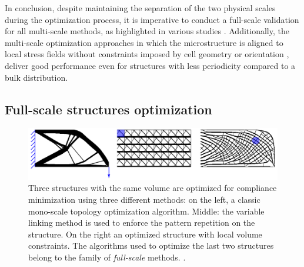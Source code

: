 In conclusion, despite maintaining the separation of the two physical scales during the optimization process, it is imperative to conduct a full-scale validation for all multi-scale methods, as highlighted in various studies . Additionally, the multi-scale optimization approaches in which the microstructure is aligned to local stress fields without constraints imposed by cell geometry or orientation , deliver good performance even for structures with less periodicity compared to a bulk distribution.

\subsection{Full-scale structures optimization}
\begin{figure}
    \centering
    \includegraphics[width=0.8\linewidth]{figures/02_literature/full-to.png}
    \caption{Three structures with the same volume are optimized for compliance minimization using three different methods: on the left, a classic mono-scale topology optimization algorithm. Middle: the variable linking method is used to enforce the pattern repetition on the structure. On the right an optimized structure with local volume constraints. The algorithms used to optimize the last two structures belong to the family of \textit{full-scale} methods. \cite{wu_topology_2021}.}
    \label{fig:02_full-to}
\end{figure}

